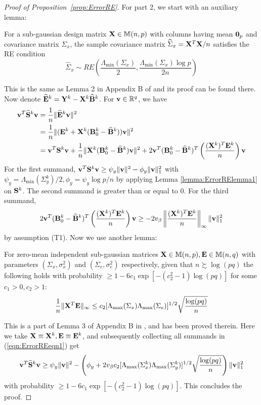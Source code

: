 \documentclass[fleqn,11pt]{article}
\numberwithin{equation}{section}
\begin{document}
\begin{proof}[Proof of Proposition~\ref{prop:ErrorRE}]
For part 2, we start with an auxiliary lemma:
%
\begin{Lemma}\label{lemma:ErrorRElemma1}
For a sub-gaussian design matrix ${\mathbf{X}} \in {\mathbb{M}}(n,p)$ with columns having mean ${\bf 0}_p$ and covariance matrix $\Sigma_x$, the sample covariance matrix $\widehat \Sigma_x = {\mathbf{X}}^T {\mathbf{X}}/n$ satisfies the RE condition
%
$$
\widehat \Sigma_x \sim RE \left( \frac{\Lambda_{\min} ( \Sigma_x) }{2}, \frac{\Lambda_{\min} ( \Sigma_x) \log p }{2 n} \right)
$$
\end{Lemma}
%
This is the same as Lemma 2 in Appendix B of \cite{LinEtal16} and its proof can be found there. Now denote $\widehat {{\mathbf{E}}}^k = {\mathbf{Y}}^k - {\mathbf{X}}^k \widehat {{\mathbf{B}}}^k$. For ${\bf{v}} \in {\mathbb{R}}^q$, we have
%
\begin{align}\label{eqn:ErrorREeqn1}
{\bf{v}}^T \widehat {{\mathbf{S}}}^k {\bf{v}} &= \frac{1}{n} \| \widehat {{\mathbf{E}}}^k {\bf{v}} \|^2 \notag\\
&= \frac{1}{n} \| ({\mathbf{E}}^k + {\mathbf{X}}^k ( {\mathbf{B}}_0^k - \widehat {{\mathbf{B}}}^k )){\bf{v}} \|^2 \notag\\
&= {\bf{v}}^T {\mathbf{S}}^k {\bf{v}} + \frac{1}{n} \| {\mathbf{X}}^k ({\mathbf{B}}_0^k - \widehat {{\mathbf{B}}}^k) {\bf{v}} \|^2 + 2 {\bf{v}}^T ({\mathbf{B}}_0^k - \widehat {{\mathbf{B}}}^k)^T \left( \frac {({\mathbf{X}}^k)^T {\mathbf{E}}^k}{n} \right) {\bf{v}}
\end{align}
%
For the first summand, $ {\bf{v}}^T {\mathbf{S}}^k {\bf{v}} \geq \psi_y \| {\bf{v}} \|^2 - \phi_y \| {\bf{v}} \|_1^2$ with $\psi_y = \Lambda_{\min} (\Sigma_y^k)/2, \phi_y = \psi_y \log p/n$ by applying Lemma \ref{lemma:ErrorRElemma1} on ${\mathbf{S}}^k$. The second summand is greater than or equal to 0. For the third summand,
%
$$
2 {\bf{v}}^T ({\mathbf{B}}_0^k - \widehat {{\mathbf{B}}}^k)^T \left( \frac {({\mathbf{X}}^k)^T {\mathbf{E}}^k}{n} \right) {\bf{v}} \geq
-2 v_\beta \left\| \frac {({\mathbf{X}}^k)^T {\mathbf{E}}^k}{n} \right\|_\infty \| {\bf{v}} \|_1^2
$$
%
by assumption (T1). Now we use another lemma:
\begin{Lemma}\label{lemma:ErrorRElemma2}
For zero-mean independent sub-gaussian matrices ${\mathbf{X}} \in {\mathbb{M}}(n,p), {\mathbf{E}} \in {\mathbb{M}}(n,q)$ with parameters $(\Sigma_x, \sigma_x^2)$ and $(\Sigma_e, \sigma_e^2)$ respectively, given that $n \succsim \log(pq)$ the following holds with probability $\geq 1 - 6c_1 \exp [-(c_2^2-1) \log(pq)]$ for some $c_1 >0, c_2 > 1$:
%
$$
\frac{1}{n} \| {\mathbf{X}}^T {\mathbf{E}} \|_\infty \leq c_2 [ \Lambda_{\max} (\Sigma_x) \Lambda_{\max} (\Sigma_e) ]^{1/2} \sqrt{\frac{ \log(pq)}{n}}
$$
%
\end{Lemma}
%
This is a part of Lemma 3 of Appendix B in \cite{LinEDtal16}, and has been proved therein. Here we take ${\mathbf{X}} \equiv {\mathbf{X}}^k, {\mathbf{E}} \equiv {\mathbf{E}}^k$, and subsequently collecting all summands in (\ref{eqn:ErrorREeqn1}) get
%
$$
{\bf{v}}^T \widehat{ {\mathbf{S}}}^k {\bf{v}} \geq \psi_y \| {\bf{v}} \|^2 - \left( \phi_y + 2 v_\beta c_2 [ \Lambda_{\max} (\Sigma_x^k) \Lambda_{\max} (\Sigma_y^k) ]^{1/2} \sqrt{\frac{ \log(pq)}{n}} \right) \| {\bf{v}} \|_1^2
$$
with probability $\geq 1 - 6c_1 \exp [-(c_2^2-1) \log(pq)]$. This concludes the proof.
\end{proof}
\end{document}
